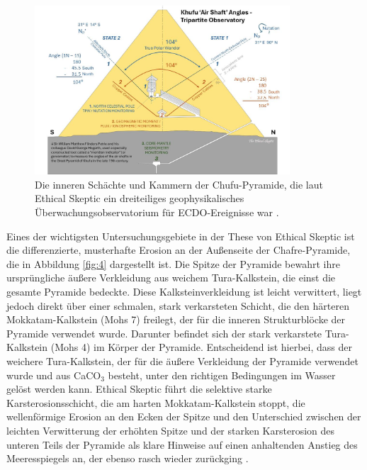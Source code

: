 \documentclass[10pt,twocolumn,letterpaper]{article}
\begin{document}
\begin{figure}[b]
\begin{center}
\includegraphics[width=0.85\textwidth]{shafts.jpg}
\end{center}
   \caption{Die inneren Schächte und Kammern der Chufu-Pyramide, die laut Ethical Skeptic ein dreiteiliges geophysikalisches Überwachungsobservatorium für ECDO-Ereignisse war \cite{28}.}
\label{fig:5}
\end{figure}

Eines der wichtigsten Untersuchungsgebiete in der These von Ethical Skeptic ist die differenzierte, musterhafte Erosion an der Außenseite der Chafre-Pyramide, die in Abbildung \ref{fig:4} dargestellt ist. Die Spitze der Pyramide bewahrt ihre ursprüngliche äußere Verkleidung aus weichem Tura-Kalkstein, die einst die gesamte Pyramide bedeckte. Diese Kalksteinverkleidung ist leicht verwittert, liegt jedoch direkt über einer schmalen, stark verkarsteten Schicht, die den härteren Mokkatam-Kalkstein (Mohs 7) freilegt, der für die inneren Strukturblöcke der Pyramide verwendet wurde. Darunter befindet sich der stark verkarstete Tura-Kalkstein (Mohs 4) im Körper der Pyramide. Entscheidend ist hierbei, dass der weichere Tura-Kalkstein, der für die äußere Verkleidung der Pyramide verwendet wurde und aus CaCO$_3$ besteht, unter den richtigen Bedingungen im Wasser gelöst werden kann. Ethical Skeptic führt die selektive starke Karsterosionsschicht, die am harten Mokkatam-Kalkstein stoppt, die wellenförmige Erosion an den Ecken der Spitze und den Unterschied zwischen der leichten Verwitterung der erhöhten Spitze und der starken Karsterosion des unteren Teils der Pyramide als klare Hinweise auf einen anhaltenden Anstieg des Meeresspiegels an, der ebenso rasch wieder zurückging \cite{27}.
\end{document}
